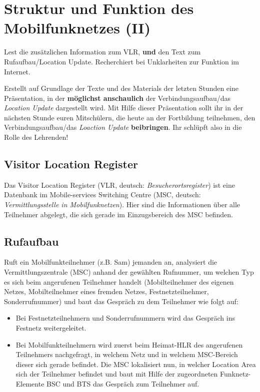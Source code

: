 \documentclass[loesung]{schulein}
\begin{document}
 
%
\section*{Struktur und Funktion des Mobilfunknetzes (II)}
\vspace*{-1cm}
\begin{aufgaben}
\item Lest die zusätzlichen Information zum VLR, \textbf{und} den Text zum Rufaufbau/Location Update. Recherchiert bei Unklarheiten zur Funktion im Internet. 
\item Erstellt auf Grundlage der Texte und des Materials der letzten Stunden eine Präsentation, in der \textbf{möglichst anschaulich} der Verbindungsaufbau/das \textit{Location Update} dargestellt wird. Mit Hilfe dieser Präsentation sollt ihr in der nächsten Stunde euren Mitschülern, die heute an der Fortbildung teilnehmen, den Verbindungsaufbau/das \textit{Loaction Update} \textbf{beibringen}. Ihr schlüpft also in die Rolle des Lehrenden!

\end{aufgaben}
%
\subsection*{Visitor Location Register}
Das Visitor Location Register (VLR, deutsch: \textit{Besucherortsregister}) ist eine Datenbank im Mobile-services Switching Centre (MSC, deutsch: \textit{Vermittlungsstelle in Mobilfunknetzen}). Hier sind die Informationen über alle Teilnehmer abgelegt, die sich gerade im Einzugsbereich des MSC befinden.

\subsection*{Rufaufbau}
Ruft ein Mobilfunkteilnehmer (z.B. Sam) jemanden an, analysiert die Vermittlungszentrale (MSC) anhand der gewählten Rufnummer, um welchen Typ es sich beim angerufenen Teilnehmer handelt (Mobilteilnehmer des eigenen Netzes, Mobilteilnehmer eines fremden Netzes, Festnetzteilnehmer, Sonderrufnummer) und baut das Gespräch zu dem Teilnehmer wie folgt auf: 
\begin{itemize}
\item Bei Festnetzteilnehmern und Sonderrufnummern wird das Gespräch ins Festnetz weitergeleitet.
\item Bei Mobilfunkteilnehmern wird zuerst beim Heimat-HLR des angerufenen Teilnehmers nachgefragt, in welchem Netz und in welchem MSC-Bereich dieser sich gerade befindet. Die MSC lokalisiert nun, in welcher Location Area sich der Teilnehmer befindet und baut mit Hilfe der zugeordneten Funknetz-Elemente BSC und BTS das Gespräch zum Teilnehmer auf.
\end{itemize}
	
\end{document}

